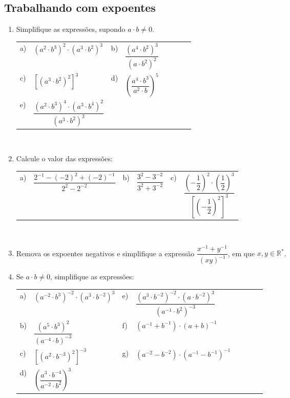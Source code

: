 \documentclass[a4paper, 11pt]{article}
\begin{document}
    \maketitle
    \begin{center}
        \section*{Trabalhando com expoentes}
    \end{center}

    \begin{enumerate}
        \item Simplifique as expressões, supondo $a\cdot b \neq 0$.

        \begin{tabularx}{\textwidth}{lXlXlXlX}
            a) & $(a^2 \cdot b^3)^2 \cdot (a^3 \cdot b^2)^3$ &
            b) & $\dfrac{(a^4 \cdot b^2)^3}{(a \cdot b^2)^2}$ \\[3ex]
            c) & $[(a^3\cdot b^2)^2]^3$ &
            d) & $\left(\dfrac{a^4\cdot b^3}{a^2\cdot b}\right)^5$ \\[3ex]
            e) & $\dfrac{(a^2\cdot b^3)^4\cdot(a^3\cdot b^4)^2}{(a^3\cdot b^2)^3}$ & & \\
        \end{tabularx} \\[2ex]
        \item Calcule o valor das expressões:

        \begin{tabularx}{\textwidth}{lXlXlX}
            a) & $\dfrac{2^{-1}-(-2)^2+(-2)^{-1}}{2^2-2^{-2}}$ &
            b) & $\dfrac{3^2-3^{-2}}{3^2+3^{-2}}$ &
            c) & $\dfrac{ \left(-\dfrac{1}{2} \right)^2 \cdot \left(\dfrac{1}{2} \right)^3} {\left[\left(-\dfrac{1}{2}\right)^2\right]^3} $\\
        \end{tabularx} \\[2ex]
        \item Remova os expoentes negativos e simplifique a expressão $\dfrac{x^{-1}+y^{-1}}{(xy)^{-1}}$, em que $x, y\in \mathbb{R}^*$.
        \item Se $a\cdot b \neq 0$, simplifique as expressões:\\

        \begin{tabularx}{\textwidth}{lXlXlXlX}
            a) & $(a^{-2}\cdot b^3)^{-2}\cdot(a^3\cdot b^{-2})^3$ &
            e) & $\dfrac{(a^3\cdot b^{-2})^{-2}\cdot(a\cdot b^{-2})^3}{(a^{-1}\cdot b^2)^{-3}}$\\[3ex]
            b) & $\dfrac{(a^5\cdot b^3)^2}{(a^{-4}\cdot b)^{-3}}$ &
            f) & $(a^{-1}+b^{-1})\cdot(a+b)^{-1}$ \\[3ex]
            c) & $[(a^2\cdot b^{-3})^2]^{-3}$ &
            g) & $(a^{-2}-b^{-2})\cdot(a^{-1}-b^{-1})^{-1}$ \\[2ex]
            d) & $\left(\dfrac{a^3\cdot b^{-4}}{a^{-2}\cdot b^2}\right)^3$ & & \\
        \end{tabularx}
    \end{enumerate}
\end{document}
